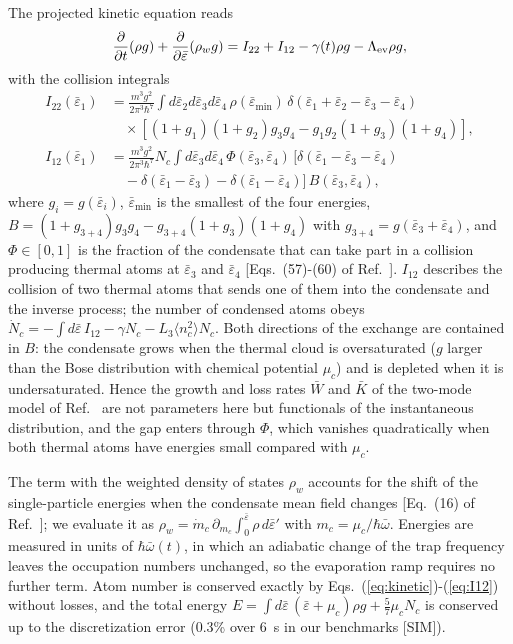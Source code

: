 The projected kinetic equation reads~\cite{Bijlsma2000}
\begin{equation}
\frac{\partial}{\partial t}(\rho g)+\frac{\partial}{\partial\bar\varepsilon}(\rho_w g)
= I_{22}+I_{12}-\gamma(t)\rho g-\Lambda_{\rm ev}\rho g ,
\label{eq:kinetic}
\end{equation}
with the collision integrals
\begin{align}
I_{22}(\bar\varepsilon_1)&=\frac{m^3g^2}{2\pi^3\hbar^7}\!\int\!d\bar\varepsilon_2d\bar\varepsilon_3d\bar\varepsilon_4\,
\rho(\bar\varepsilon_{\min})\,\delta(\bar\varepsilon_1+\bar\varepsilon_2-\bar\varepsilon_3-\bar\varepsilon_4)\nonumber\\
&\quad\times[(1+g_1)(1+g_2)g_3g_4-g_1g_2(1+g_3)(1+g_4)],
\label{eq:I22}\\
I_{12}(\bar\varepsilon_1)&=\frac{m^3g^2}{2\pi^3\hbar^7}N_c\!\int\!d\bar\varepsilon_3d\bar\varepsilon_4\,
\Phi(\bar\varepsilon_3,\bar\varepsilon_4)\,
[\delta(\bar\varepsilon_1-\bar\varepsilon_3-\bar\varepsilon_4)\nonumber\\
&\quad-\delta(\bar\varepsilon_1-\bar\varepsilon_3)-\delta(\bar\varepsilon_1-\bar\varepsilon_4)]\,
B(\bar\varepsilon_3,\bar\varepsilon_4),
\label{eq:I12}
\end{align}
where $g_i=g(\bar\varepsilon_i)$, $\bar\varepsilon_{\min}$ is the smallest of the
four energies, $B=(1+g_{3+4})g_3g_4-g_{3+4}(1+g_3)(1+g_4)$ with
$g_{3+4}=g(\bar\varepsilon_3+\bar\varepsilon_4)$, and $\Phi\in[0,1]$ is the fraction
of the condensate that can take part in a collision producing thermal atoms at
$\bar\varepsilon_3$ and $\bar\varepsilon_4$ [Eqs.~(57)-(60) of Ref.~\cite{Bijlsma2000}].
$I_{12}$ describes the collision of two thermal atoms that sends one of them
into the condensate and the inverse process; the number of condensed atoms
obeys $\dot N_c=-\int d\bar\varepsilon\,I_{12}-\gamma N_c-L_3\langle n_c^2\rangle N_c$.
Both directions of the exchange are contained in $B$: the condensate grows when
the thermal cloud is oversaturated ($g$ larger than the Bose distribution with
chemical potential $\mu_c$) and is depleted when it is undersaturated. Hence
the growth and loss rates $\bar W$ and $\bar K$ of the two-mode model of
Ref.~\cite{MelladoMunoz2020} are not parameters here but functionals of the
instantaneous distribution, and the gap enters through $\Phi$, which vanishes
quadratically when both thermal atoms have energies small compared with
$\mu_c$.

The term with the weighted density of states $\rho_w$ accounts for the shift
of the single-particle energies when the condensate mean field changes
[Eq.~(16) of Ref.~\cite{Bijlsma2000}]; we evaluate it as
$\rho_w=\dot m_c\,\partial_{m_c}\!\int_0^{\bar\varepsilon}\!\rho\,d\bar\varepsilon'$
with $m_c=\mu_c/\hbar\bar\omega$. Energies are measured in units of
$\hbar\bar\omega(t)$, in which an adiabatic change of the trap frequency leaves
the occupation numbers unchanged, so the evaporation ramp requires no further
term. Atom number is conserved exactly by Eqs.~(\ref{eq:kinetic})-(\ref{eq:I12})
without losses, and the total energy
$E=\int d\bar\varepsilon\,(\bar\varepsilon+\mu_c)\rho g+\tfrac57\mu_cN_c$ is conserved
up to the discretization error (0.3\% over 6~s in our benchmarks [SIM]).

